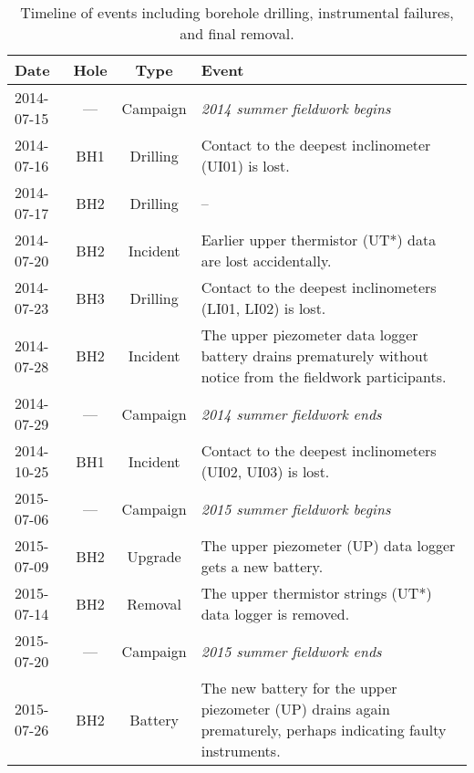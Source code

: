 \documentclass[utf8]{article}
\begin{document}
    \begin{table}
      \caption{%
        Timeline of events including borehole drilling, instrumental failures,
        and final removal.}
      \label{tab:timeline}
      {\begin{tabular}{lccp{95mm}}
        \hline
        Date       & Hole & Type      & Event \\
        \hline
        2014-07-15 & ---  & Campaign & \emph{2014 summer fieldwork begins} \\
        2014-07-16 & BH1  & Drilling & Contact to the deepest inclinometer
                                       (UI01) is lost. \\
        2014-07-17 & BH2  & Drilling & -- \\
        2014-07-20 & BH2  & Incident & Earlier upper thermistor (UT*) data are
                                       lost accidentally. \\
        2014-07-23 & BH3  & Drilling & Contact to the deepest inclinometers
                                       (LI01, LI02) is lost. \\
        2014-07-28 & BH2  & Incident & The upper piezometer data logger battery
                                       drains prematurely without notice from
                                       the fieldwork participants. \\
        2014-07-29 & ---  & Campaign & \emph{2014 summer fieldwork ends} \\
        \hline
        2014-10-25 & BH1  & Incident & Contact to the deepest inclinometers
                                       (UI02, UI03) is lost. \\
        \hline
        2015-07-06 & ---  & Campaign & \emph{2015 summer fieldwork begins} \\
        2015-07-09 & BH2  & Upgrade  & The upper piezometer (UP) data logger
                                       gets a new battery. \\
        2015-07-14 & BH2  & Removal  & The upper thermistor strings (UT*) data
                                       logger is removed. \\
        2015-07-20 & ---  & Campaign & \emph{2015 summer fieldwork ends} \\
        \hline
        2015-07-26 & BH2  & Battery  & The new battery for the upper piezometer
                                       (UP) drains again prematurely, perhaps
                                       indicating faulty instruments. \\

\end{tabular}}
\end{table}
\end{document}
